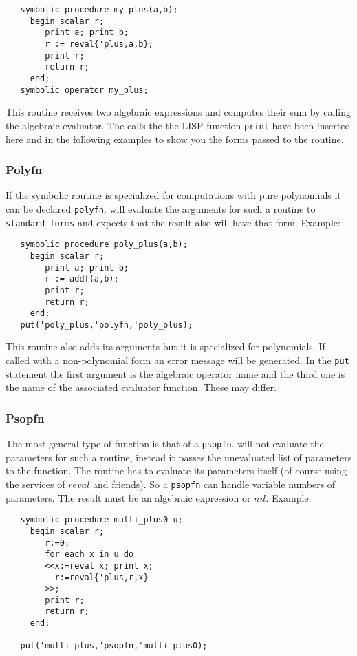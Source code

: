 \begin{verbatim}
   symbolic procedure my_plus(a,b);
     begin scalar r;
        print a; print b;
        r := reval{'plus,a,b};
        print r;
        return r;
     end;
   symbolic operator my_plus;
\end{verbatim}

This routine receives two algebraic expressions and computes
their sum by calling the algebraic evaluator.
The calls the the LISP function {\tt print} have been inserted here
and in the following examples to show you the forms passed to the routine.

\subsubsection{Polyfn}

If the symbolic routine is specialized for computations
with pure polynomials it can be declared {\tt polyfn}.
{\reduce} will evaluate the arguments for such a routine
to {\tt standard forms} and expects that
the result also will have that form. 
Example:

\begin{verbatim}
   symbolic procedure poly_plus(a,b);
     begin scalar r;
        print a; print b;
        r := addf(a,b);
        print r;
        return r;
     end;
   put('poly_plus,'polyfn,'poly_plus);
\end{verbatim}

This routine also adds its arguments
but it is specialized for polynomials. If called with
a non-polynomial form an error message will be generated.
In the {\tt put} statement the first argument is the algebraic
operator name and the third one is the name of the associated
evaluator function. These may differ.

\subsubsection{Psopfn}

The most general type of function is that of a {\tt psopfn}.
{\reduce} will not evaluate the parameters for such a routine,
instead it passes the unevaluated list of parameters to the
function. The routine has to evaluate its parameters itself (of course
using the services of $reval$ and friends). So a {\tt psopfn}
can handle variable numbers of parameters. The result must
be an algebraic expression or $nil$. Example:

\begin{verbatim}
   symbolic procedure multi_plus0 u;
     begin scalar r;
        r:=0;
        for each x in u do 
        <<x:=reval x; print x;
          r:=reval{'plus,r,x}
        >>;
        print r;
        return r;
     end;

   put('multi_plus,'psopfn,'multi_plus0);
\end{verbatim}

